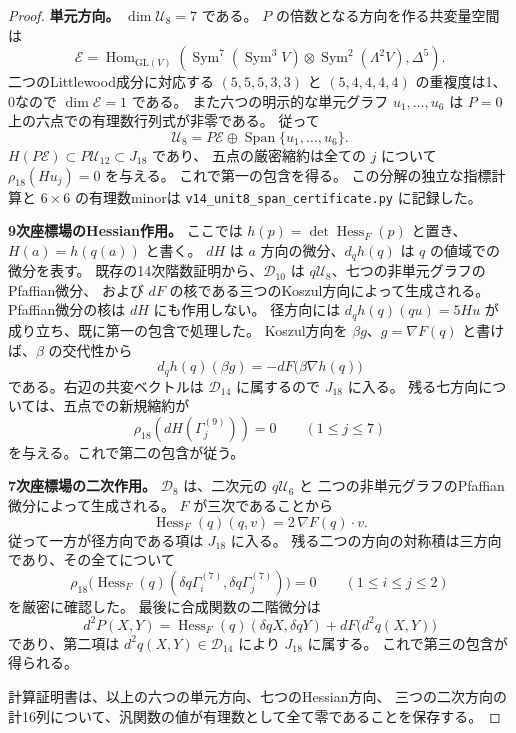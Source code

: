 \begin{proof}
\textbf{単元方向。}
$\dim\mathcal U_8=7$ である。
$P$ の倍数となる方向を作る共変量空間は
\[
 \mathcal E=
 \operatorname{Hom}_{\mathrm{GL}(V)}
 \left(\operatorname{Sym}^7(\operatorname{Sym}^3V)
 \otimes\operatorname{Sym}^2(\Lambda^2V),\Delta^5\right).
\]
二つのLittlewood成分に対応する
$(5,5,5,3,3)$ と $(5,4,4,4,4)$ の重複度は1、0なので
$\dim\mathcal E=1$ である。
また六つの明示的な単元グラフ $u_1,\ldots,u_6$ は
$P=0$ 上の六点での有理数行列式が非零である。
従って
\[
 \mathcal U_8=P\mathcal E\oplus
             \operatorname{Span}\{u_1,\ldots,u_6\}.
\]
$H(P\mathcal E)\subset P\mathcal U_{12}\subset J_{18}$ であり、
五点の厳密縮約は全ての $j$ について $\rho_{18}(Hu_j)=0$ を与える。
これで第一の包含を得る。
この分解の独立な指標計算と $6\times6$ の有理数minorは
\texttt{v14\_unit8\_span\_certificate.py} に記録した。

\textbf{9次座標場のHessian作用。}
ここでは $h(p)=\det\operatorname{Hess}_F(p)$ と置き、
$H(a)=h(q(a))$ と書く。
$dH$ は $a$ 方向の微分、$d_qh(q)$ は $q$ の値域での微分を表す。
既存の14次階数証明から、$\mathcal D_{10}$ は
$q\mathcal U_8$、七つの非単元グラフのPfaffian微分、
および $dF$ の核である三つのKoszul方向によって生成される。
Pfaffian微分の核は $dH$ にも作用しない。
径方向には $d_qh(q)(q u)=5Hu$ が成り立ち、既に第一の包含で処理した。
Koszul方向を $\beta g$、$g=\nabla F(q)$ と書けば、$\beta$ の交代性から
\[
 d_qh(q)(\beta g)=-dF\bigl(\beta\nabla h(q)\bigr)
\]
である。右辺の共変ベクトルは $\mathcal D_{14}$ に属するので $J_{18}$ に入る。
残る七方向については、五点での新規縮約が
\[
 \rho_{18}(dH(\Gamma_j^{(9)}))=0\qquad(1\le j\le7)
\]
を与える。これで第二の包含が従う。

\textbf{7次座標場の二次作用。}
$\mathcal D_8$ は、二次元の $q\mathcal U_6$ と
二つの非単元グラフのPfaffian微分によって生成される。
$F$ が三次であることから
\[
 \operatorname{Hess}_F(q)(q,v)=2\,\nabla F(q)\cdot v.
\]
従って一方が径方向である項は $J_{18}$ に入る。
残る二つの方向の対称積は三方向であり、その全てについて
\[
 \rho_{18}\bigl(\operatorname{Hess}_F(q)
       (\delta q\Gamma_i^{(7)},\delta q\Gamma_j^{(7)})\bigr)=0
 \qquad(1\le i\le j\le2)
\]
を厳密に確認した。
最後に合成関数の二階微分は
\[
 d^2P(X,Y)=\operatorname{Hess}_F(q)(\delta qX,\delta qY)
          +dF\bigl(d^2q(X,Y)\bigr)
\]
であり、第二項は $d^2q(X,Y)\in\mathcal D_{14}$ により $J_{18}$ に属する。
これで第三の包含が得られる。

計算証明書は、以上の六つの単元方向、七つのHessian方向、
三つの二次方向の計16列について、汎関数の値が有理数として全て零であることを保存する。
\end{proof}

